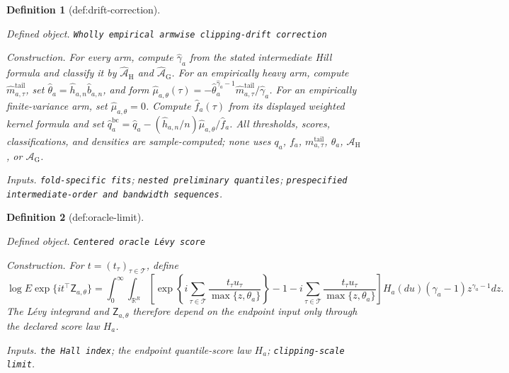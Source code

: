 \documentclass{article}
\newtheorem{definition}{Definition}
\begin{document}
\begin{definition}[def:drift-correction]\label{def:drift-correction}
\par\smallskip\noindent\emph{Defined object.} \texttt{Wholly empirical armwise clipping-\allowbreak{}drift correction}
\par\smallskip\noindent\emph{Construction.} For every arm, compute \(\widehat\gamma_a\) from the stated intermediate Hill formula and classify it by \(\widehat{\mathcal A}_{\mathrm H}\) and \(\widehat{\mathcal A}_{\mathrm G}\). For an empirically heavy arm, compute \(\widehat m^{\mathrm{tail}}_{a,\tau}\), set \(\widehat\theta_a=\widehat h_{a,n}\widehat b_{a,n}\), and form \(\widehat\mu_{a,\theta}(\tau)=-\widehat\theta_a^{\widehat\gamma_a-1}\widehat m^{\mathrm{tail}}_{a,\tau}/\widehat\gamma_a\). For an empirically finite-variance arm, set \(\widehat\mu_{a,\theta}=0\). Compute \(\widehat f_a(\tau)\) from its displayed weighted kernel formula and set \(\widehat q_a^{\mathrm{bc}}=\widehat q_a-(\widehat h_{a,n}/n)\widehat\mu_{a,\theta}/\widehat f_a\). All thresholds, scores, classifications, and densities are sample-computed; none uses \(q_a\), \(f_a\), \(m^{\mathrm{tail}}_{a,\tau}\), \(\theta_a\), \(\mathcal A_{\mathrm H}\), or \(\mathcal A_{\mathrm G}\).
\par\smallskip\noindent\emph{Inputs.} \texttt{fold-\allowbreak{}specific fits}; \texttt{nested preliminary quantiles}; \texttt{prespecified intermediate-\allowbreak{}order and bandwidth sequences}.
\end{definition}

\begin{definition}[def:oracle-limit]\label{def:oracle-limit}
\par\smallskip\noindent\emph{Defined object.} \texttt{Centered oracle Lévy score}
\par\smallskip\noindent\emph{Construction.} For \(t=(t_\tau)_{\tau\in\mathcal T}\), define \[\log E\exp\{it^\top\mathsf Z_{a,\theta}\}=\int_0^\infty\int_{\mathbb R^R}\left[\exp\left\{i\sum_{\tau\in\mathcal T}\frac{t_\tau u_\tau}{\max\{z,\theta_a\}}\right\}-1-i\sum_{\tau\in\mathcal T}\frac{t_\tau u_\tau}{\max\{z,\theta_a\}}\right]H_a(du)(\gamma_a-1)z^{\gamma_a-1}dz.\] The Lévy integrand and \(\mathsf Z_{a,\theta}\) therefore depend on the endpoint input only through the declared score law \(H_a\).
\par\smallskip\noindent\emph{Inputs.} \texttt{the Hall index}; the endpoint quantile-score law \(H_a\); \texttt{clipping-\allowbreak{}scale limit}.
\end{definition}
\end{document}
